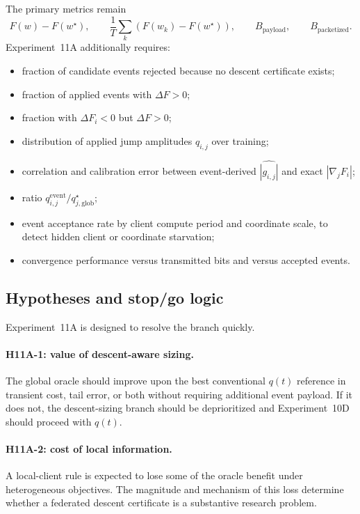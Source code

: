 The primary metrics remain
\begin{equation}
  F(w)-F(w^\star),\qquad
  \frac{1}{T}\sum_k(F(w_k)-F(w^\star)),\qquad
  B_{\mathrm{payload}},\qquad
  B_{\mathrm{packetized}}.
\end{equation}
Experiment~11A additionally requires:
\begin{itemize}
  \item fraction of candidate events rejected because no descent certificate exists;
  \item fraction of applied events with $\Delta F>0$;
  \item fraction with $\Delta F_i<0$ but $\Delta F>0$;
  \item distribution of applied jump amplitudes $q_{i,j}$ over training;
  \item correlation and calibration error between event-derived $\widehat{|g_{i,j}|}$ and exact $|\nabla_jF_i|$;
  \item ratio $q_{i,j}^{\mathrm{event}}/q_{j,\mathrm{glob}}^\star$;
  \item event acceptance rate by client compute period and coordinate scale, to detect hidden client or coordinate starvation;
  \item convergence performance versus transmitted bits and versus accepted events.
\end{itemize}

\subsection{Hypotheses and stop/go logic}

Experiment~11A is designed to resolve the branch quickly.

\paragraph{H11A-1: value of descent-aware sizing.}
The global oracle should improve upon the best conventional $q(t)$ reference in transient cost, tail error, or both without requiring additional event payload. If it does not, the descent-sizing branch should be deprioritized and Experiment~10D should proceed with $q(t)$.

\paragraph{H11A-2: cost of local information.}
A local-client rule is expected to lose some of the oracle benefit under heterogeneous objectives. The magnitude and mechanism of this loss determine whether a federated descent certificate is a substantive research problem.

